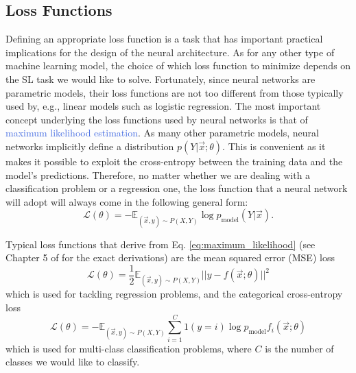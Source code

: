 \subsection{Loss Functions}
\label{sec:loss_functions}
Defining an appropriate loss function is a task that has important practical implications for the design of the neural architecture. As for any other type of machine learning model, the choice of which loss function to minimize depends on the SL task we would like to solve. Fortunately, since neural networks are parametric models, their loss functions are not too different from those typically used by, e.g.,  linear models such as logistic regression. The most important concept underlying the loss functions used by neural networks is that of \textcolor{RoyalBlue}{maximum likelihood estimation}. As many other parametric models, neural networks implicitly define a distribution $p(Y|\vec{x};\theta)$. This is convenient as it makes it possible to exploit the cross-entropy between the training data and the model's predictions. Therefore, no matter whether we are dealing with a classification problem or a regression one, the loss function that a neural network will adopt will always come in the following general form:
\begin{equation}
	\mathscr{L}(\theta) = - \mathds{E}_{(\vec{x},y)\sim P(X,Y)} \log p_\text{model} (Y|\vec{x}).
	\label{eq:maximum_likelihood}
\end{equation}

Typical loss functions that derive from Eq. \ref{eq:maximum_likelihood} (see Chapter 5 of \cite{goodfellow2016deep} for the exact derivations) are the mean squared error (MSE) loss
\begin{equation}
	\mathscr{L}(\theta) = \frac{1}{2}\mathds{E}_{(\vec{x},y)\sim P(X,Y)} ||y - f(\vec{x};\theta) ||^{2}
	\label{eq:mean_squared_error}
\end{equation}
which is used for tackling regression problems, and the categorical cross-entropy loss
\begin{equation}
	\mathscr{L}(\theta) = - \mathds{E}_{(\vec{x},y)\sim P(X,Y)} \sum_{i=1}^{C} 1(y=i) \log p_\text{model} f_i(\vec{x};\theta)
	\label{eq:cross_entropy}
\end{equation}
which is used for multi-class classification problems, where $C$ is the number of classes we would like to classify. 

